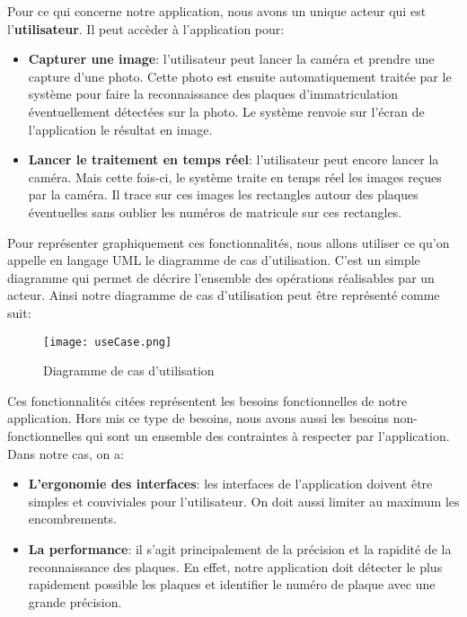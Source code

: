     Pour ce qui concerne notre application, nous avons un unique acteur qui est l’\textbf{utilisateur}. Il peut accèder à l'application pour:
    \begin{itemize}
        \item \textbf{Capturer une image}: l’utilisateur peut lancer la caméra et prendre une capture d’une photo. Cette photo est ensuite automatiquement traitée par le système pour faire la reconnaissance des plaques d’immatriculation éventuellement détectées sur la photo. Le système renvoie sur l’écran de l’application le résultat en image.
        \item \textbf{Lancer le traitement en temps réel}: l’utilisateur peut encore lancer la caméra. Mais cette fois-ci, le système traite en temps réel les images reçues par la caméra. Il trace sur ces images les rectangles autour des plaques éventuelles sans oublier les numéros de matricule sur ces rectangles.
    \end{itemize}
    Pour représenter graphiquement ces fonctionnalités, nous allons utiliser ce qu’on appelle en langage UML le diagramme de cas d’utilisation. C’est un simple diagramme qui permet de décrire l’ensemble des opérations réalisables par un acteur. Ainsi notre diagramme de cas d’utilisation peut être représenté comme suit:
    \begin{figure}[H]
        \centering
        \texttt{[image: useCase.png]}
        \caption{Diagramme de cas d'utilisation}
    \end{figure}
    Ces fonctionnalités citées représentent les besoins fonctionnelles de notre application. Hors mis ce type de besoins, nous avons aussi les besoins non-fonctionnelles qui sont un ensemble des contraintes à respecter par l'application. Dans notre cas, on a:
    \begin{itemize}
        \item \textbf{L'ergonomie des interfaces}: les interfaces de l'application doivent être simples et conviviales pour l'utilisateur. On doit aussi limiter au maximum les encombrements.
        \item \textbf{La performance}: il s'agit principalement de la précision et la rapidité de la reconnaissance des plaques. En effet, notre application doit détecter le plus rapidement possible les plaques et identifier le numéro de plaque avec une grande précision. 
    \end{itemize}

